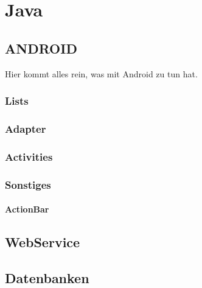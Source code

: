 \chapter{Java}
\section{ANDROID}
Hier kommt alles rein, was mit Android zu tun hat.

\subsection{Lists}
\subsection{Adapter}
\subsection{Activities}
\subsection{Sonstiges}
\subsubsection{ActionBar}


\section{WebService}

\section{Datenbanken}
